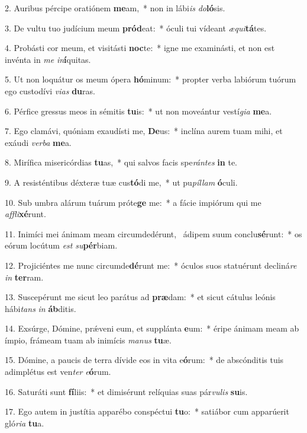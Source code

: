 2. Auribus pércipe oratiónem \textbf{me}am,~*  non in lábi\textit{is} \textit{do}\textbf{ló}sis.\

3. De vultu tuo judícium meum \textbf{pród}eat:~*  óculi tui vídeant \textit{æ}\textit{qui}\textbf{tá}tes.\

4. Probásti cor meum, et visitásti \textbf{noc}te:~*  igne me examinásti, et non est invénta in \textit{me} \textit{in}\textbf{í}quitas.\

5. Ut non loquátur os meum ópera \textbf{hó}minum:~*  propter verba labiórum tuórum ego custodívi \textit{vi}\textit{as} \textbf{du}ras.\

6. Pérfice gressus meos in sémitis \textbf{tu}is:~*  ut non moveántur vestí\textit{gi}\textit{a} \textbf{me}a.\

7. Ego clamávi, quóniam exaudísti me, \textbf{De}us:~*  inclína aurem tuam mihi, et exáudi \textit{ver}\textit{ba} \textbf{me}a.\

8. Mirífica misericórdias \textbf{tu}as,~*  qui salvos facis spe\textit{rán}\textit{tes} \textbf{in} te.\

9. A resisténtibus déxteræ tuæ cus\textbf{tó}di me,~*  ut pu\textit{píl}\textit{lam} \textbf{ó}culi.\

10. Sub umbra alárum tuárum próte\textbf{ge} me:~*  a fácie impiórum qui me \textit{af}\textit{fli}\textbf{xé}runt.\

11. Inimíci mei ánimam meam circumdedérunt, \dag\  ádipem suum conclu\textbf{sé}runt:~*  os eórum locútum \textit{est} \textit{su}\textbf{pér}biam.\

12. Projiciéntes me nunc circumde\textbf{dé}runt me:~*  óculos suos statuérunt decliná\textit{re} \textit{in} \textbf{ter}ram.\

13. Suscepérunt me sicut leo parátus ad \textbf{præ}dam:~*  et sicut cátulus leónis hábi\textit{tans} \textit{in} \textbf{áb}ditis.\

14. Exsúrge, Dómine, prǽveni eum, et supplánta \textbf{e}um:~*  éripe ánimam meam ab ímpio, frámeam tuam ab inimícis \textit{ma}\textit{nus} \textbf{tu}æ.\

15. Dómine, a paucis de terra dívide eos in vita e\textbf{ó}rum:~*  de abscónditis tuis adimplétus est ven\textit{ter} \textit{e}\textbf{ó}rum.\

16. Saturáti sunt \textbf{fí}liis:~*  et dimisérunt relíquias suas pár\textit{vu}\textit{lis} \textbf{su}is.\

17. Ego autem in justítia apparébo conspéctui \textbf{tu}o:~*  satiábor cum apparúerit gló\textit{ri}\textit{a} \textbf{tu}a.\

